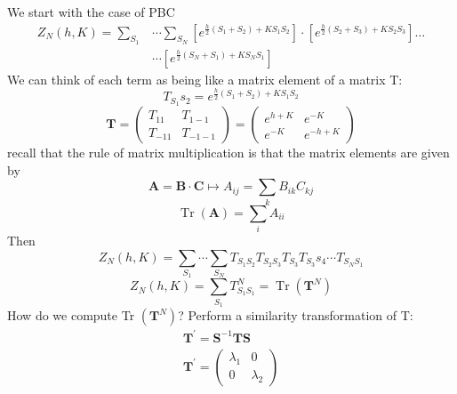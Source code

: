\documentclass[12pt,titlepage]{article}
\numberwithin{equation}{section}
\begin{document}
We start with the case of PBC
\begin{equation}
\begin{aligned} Z_{N}(h, K)=\sum_{S_{1}} & \cdots \sum_{S_{N}}\left[e^{\frac{h}{2}\left(S_{1}+S_{2}\right)+K S_{1} S_{2}}\right] \cdot\left[e^{\frac{h}{2}\left(S_{2}+S_{3}\right)+K S_{2} S_{3}}\right] \ldots \\ & \cdots\left[e^{\frac{h}{2}\left(S_{N}+S_{1}\right)+K S_{N} S_{1}}\right] \end{aligned}
\end{equation}
We can think of each term as being like a matrix element of a matrix T:
\begin{equation}
T_{S_{1}} s_{2}=e^{\frac{h}{2}\left(S_{1}+S_{2}\right)+K S_{1} S_{2}}
\end{equation}
\begin{equation}
\mathbf{T}=\left(\begin{array}{cc}{T_{11}} & {T_{1-1}} \\ {T_{-11}} & {T_{-1-1}}\end{array}\right)=\left(\begin{array}{cc}{e^{h+K}} & {e^{-K}} \\ {e^{-K}} & {e^{-h+K}}\end{array}\right)
\end{equation}
recall that the rule of matrix multiplication is that the matrix elements are given by
\begin{equation}
\mathbf{A}=\mathbf{B} \cdot \mathbf{C} \longmapsto A_{i j}=\sum_{k} B_{i k} C_{k j}
\end{equation}
\begin{equation}
\operatorname{Tr}(\mathbf{A})=\sum_{i} A_{i i}
\end{equation}
Then
\begin{equation}
Z_{N}(h, K)=\sum_{S_{1}} \cdots \sum_{S_{N}} T_{S_{1} S_{2}} T_{S_{2} S_{3}} T_{S_{3}} T_{S_{3}} s_{4} \cdots T_{S_{N} S_{1}}
\end{equation}
\begin{equation}
Z_{N}(h, K)=\sum_{S_{1}} T_{S_{1} S_{1}}^{N}=\operatorname{Tr}\left(\mathbf{T}^{N}\right)
\end{equation}
How do we compute Tr $\left(\mathbf{T}^{N}\right)$? Perform a similarity transformation of T:
\begin{equation}
\begin{array}{c}{\mathbf{T}^{\prime}=\mathbf{S}^{-1} \mathbf{T} \mathbf{S}} \\ {\mathbf{T}^{\prime}=\left(\begin{array}{cc}{\lambda_{1}} & {0} \\ {0} & {\lambda_{2}}\end{array}\right)}\end{array}
\end{equation}
\end{document}
